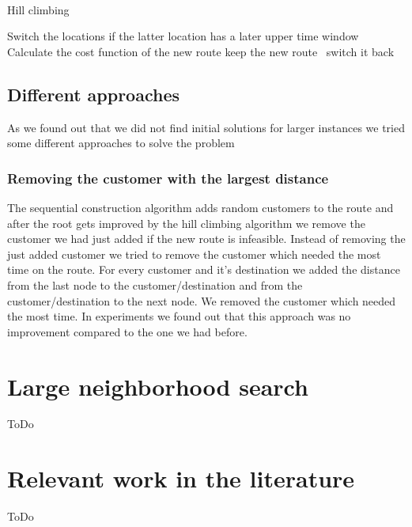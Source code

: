 \documentclass[fleqn]{scrartcl}
\begin{document}
\\

\begin{algorithm}
\caption{Hill climbing}\label{euclid}
\begin{algorithmic}[1]

\State Switch the locations if the latter location has a later upper time window
\State Calculate the cost function of the new route
 keep the new route \Else ~switch it back
\EndIf


\end{algorithmic}
\end{algorithm}



\subsection{Different approaches}
As we found out that we did not find initial solutions for larger instances we tried some different approaches to solve the problem

\subsubsection{Removing the customer with the largest distance}
The sequential construction algorithm adds random customers to the route and after the root gets improved by the hill climbing algorithm we remove the customer we had just added if the new route is infeasible. Instead of removing the just added customer we tried to remove the customer which needed the most time on the route. For every customer and it's destination we added the distance from the last node to the customer/destination and from the customer/destination to the next node. We removed the customer which needed the most time. In experiments we found out that this approach was no improvement compared to the one we had before.

\newpage
\section{Large neighborhood search}
ToDo
\newpage
\section{Relevant work in the literature}
ToDo \\
\\

\newpage
\end{document}
